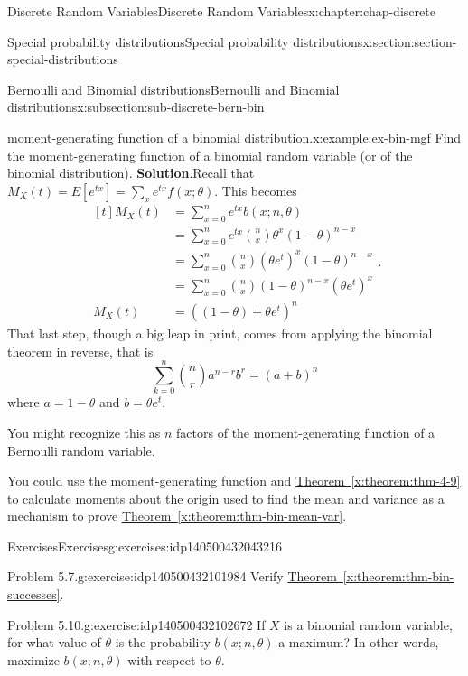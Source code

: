 \documentclass[oneside,10pt,]{book}
\newcommand{\blocktitlefont}{\relax}
\newcommand{\xreffont}{\relax}
\newcommand{\amp}{&}
\begin{document}
\begin{chapterptx}{Discrete Random Variables}{}{Discrete Random Variables}{}{}{x:chapter:chap-discrete}
\begin{sectionptx}{Special probability distributions}{}{Special probability distributions}{}{}{x:section:section-special-distributions}
\begin{subsectionptx}{Bernoulli and Binomial distributions}{}{Bernoulli and Binomial distributions}{}{}{x:subsection:sub-discrete-bern-bin}
\begin{example}{moment-generating function of a binomial distribution.}{x:example:ex-bin-mgf}
Find the moment-generating function of a binomial random variable (or of the binomial distribution).%
\textbf{\blocktitlefont Solution}.\quad{}Recall that \(\displaystyle M_X(t) = E[e^{tx}] = \sum_x e^{tx} f(x;
\theta)\). This becomes%
\begin{equation*}
\begin{aligned}[t]
M_X(t) \amp = \sum_{x=0}^n e^{tx} b(x; n, \theta)\\
\amp = \sum_{x=0}^n e^{tx} {n \choose x} \theta^x (1-\theta)^{n-x}\\
\amp = \sum_{x=0}^n {n \choose x} \left(\theta e^t\right)^x
(1-\theta)^{n-x}\\
\amp = \sum_{x=0}^n {n \choose x} (1-\theta)^{n-x}\left(\theta
e^t\right)^x\\
M_X(t) \amp = \left((1-\theta) + \theta e^t\right)^n
\end{aligned}\text{.}
\end{equation*}
That last step, though a big leap in print, comes from applying the binomial theorem in reverse, that is%
\begin{equation*}
\sum_{k=0}^n {n \choose
r}a^{n-r} b^r = (a+b)^n
\end{equation*}
where \(a=1-\theta\) and \(b = \theta
e^t\).%
\end{example}
You might recognize this as \(n\) factors of the moment-generating function of a Bernoulli random variable.%
\par
You could use the moment-generating function and \hyperref[x:theorem:thm-4-9]{Theorem~{\xreffont\ref{x:theorem:thm-4-9}}} to calculate moments about the origin used to find the mean and variance as a mechanism to prove \hyperref[x:theorem:thm-bin-mean-var]{Theorem~{\xreffont\ref{x:theorem:thm-bin-mean-var}}}.%
\end{subsectionptx}
%
%
\typeout{************************************************}
\typeout{************************************************}
%
\begin{exercises-subsection}{Exercises}{}{Exercises}{}{}{g:exercises:idp140500432043216}
\begin{divisionexercise}{1}{Problem 5.7.}{}{g:exercise:idp140500432101984}%
Verify \hyperref[x:theorem:thm-bin-successes]{Theorem~{\xreffont\ref{x:theorem:thm-bin-successes}}}.%
\end{divisionexercise}%
\begin{divisionexercise}{2}{Problem 5.10.}{}{g:exercise:idp140500432102672}%
If \(X\) is a binomial random variable, for what value of \(\theta\) is the probability \(b(x; n, \theta)\) a maximum? In other words, maximize \(b(x; n, \theta)\) with respect to \(\theta\).%

\end{divisionexercise}
\end{exercises-subsection}
\end{sectionptx}
\end{chapterptx}
\end{document}
